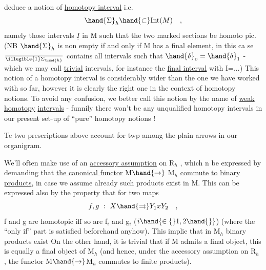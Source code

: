 deduce a notion of \uline{homotopy interval}  i.e.
\[ \hand{\Sigma}_h \hand{\subset} \mathrm{Int}(M) \quad , \]
namely those intervals $\underline{I}$ in M such that the  two marked sections be homoto%
pic. (NB $\hand{\Sigma}_h$ is non empty if and only if M has a final element,  in this ca%
se $\over{\illegible{1}}{\Sigma}_{\hand{h}}$ contains all intervals such that $\hand{\delta}_o=\hand{\delta}_1$  -  which we may call \uline{trivial}
intervals,  for instance the \uline{final interval} with I=...)  This notion of
a homotopy interval is considerably wider than the one we have worked with
so far,  however it is clearly the right one in the context of  homotopy
notions.  To avoid any confusion,  we better call this notion by the name
of \uline{weak} \uline{homotopy} \uline{intervals}  -  funnily there won't be any unqualified
homotopy intervals in our present set-up of ``pure'' homotopy notions !

Te two prescriptions  above account for twp  among the plain arrows
in our organigram.

We'll often make use of an \uline{accessory assumption} on R$_h$ ,  which n
be expressed by demanding that \uline{the canonical functor} M$\hand{\to}$ M$_h$  \uline{commute} \uline{to}
\uline{binary products},  in case we assume already such products exist in M.
This can be expressed also by the property that for two maps
\[ f,g \ :\ X \hand{\rightrightarrows} Y_1 x Y_2 \quad , \]
f and g are homotopic iff  so are f$_i$ and g$_i$  ($i\hand{\in\{}1,2\hand{\}}$)  (where the ``only
if'' part is satisfied  beforehand anyhow).  This implie  that in
M$_h$ binary products exist\hand{,}    On the other hand,  it is trivial that
if M admits a final object,  this is equally a final object of M$_h$  (and
hence,  under the accessory assumption on R$_h$ ,  the functor M$\hand{\to}$M$_h$ commutes
to finite products).

